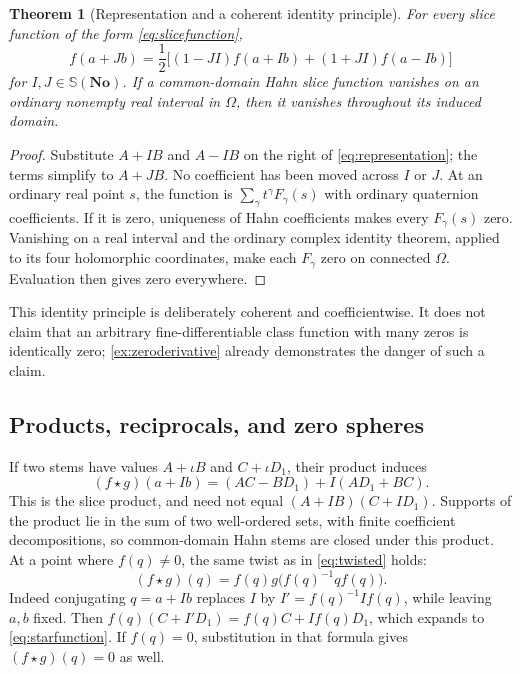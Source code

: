 \documentclass[11pt,letterpaper]{article}
\numberwithin{equation}{section}
\newtheorem{theorem}{Theorem}[section]
\theoremstyle{definition}
\theoremstyle{remark}
\newcommand{\No}{\mathbf{No}}
\begin{document}
\begin{theorem}[Representation and a coherent identity principle]\label{thm:representation}
For every slice function of the form \eqref{eq:slicefunction},
\begin{equation}\label{eq:representation}
 f(a+Jb)=\frac12\bigl[(1-JI)f(a+Ib)+(1+JI)f(a-Ib)\bigr]
\end{equation}
for $I,J\in\mathbb S(\No)$. If a common-domain Hahn slice function vanishes on an ordinary
nonempty real interval in $\Omega$, then it vanishes throughout its induced domain.
\end{theorem}
\begin{proof}
Substitute $A+IB$ and $A-IB$ on the right of \eqref{eq:representation}; the terms simplify
to $A+JB$. No coefficient has been moved across $I$ or $J$.
At an ordinary real point $s$, the function is
$\sum_\gamma t^\gamma F_\gamma(s)$ with ordinary quaternion coefficients. If it is zero,
uniqueness of Hahn coefficients makes every $F_\gamma(s)$ zero. Vanishing on a real interval
and the ordinary complex identity theorem, applied to its four holomorphic coordinates,
make each $F_\gamma$ zero on connected $\Omega$. Evaluation then gives zero everywhere.
\end{proof}

This identity principle is deliberately coherent and coefficientwise. It does not claim that
an arbitrary fine-differentiable class function with many zeros is identically zero;
\cref{ex:zeroderivative} already demonstrates the danger of such a claim.

\subsection{Products, reciprocals, and zero spheres}
If two stems have values $A+\iota B$ and $C+\iota D_1$, their product induces
\begin{equation}\label{eq:starfunction}
 (f\star g)(a+Ib)=(AC-BD_1)+I(AD_1+BC).
\end{equation}
This is the slice product, and need not equal $(A+IB)(C+ID_1)$. Supports of the product
lie in the sum of two well-ordered sets, with finite coefficient decompositions, so common-domain
Hahn stems are closed under this product.
At a point where $f(q)\ne0$, the same twist as in \eqref{eq:twisted} holds:
\begin{equation}\label{eq:twistedfunction}
 (f\star g)(q)=f(q)g\bigl(f(q)^{-1}qf(q)\bigr).
\end{equation}
Indeed conjugating $q=a+Ib$ replaces $I$ by $I'=f(q)^{-1}If(q)$, while leaving $a,b$ fixed.
Then $f(q)(C+I'D_1)=f(q)C+If(q)D_1$, which expands to \eqref{eq:starfunction}.
If $f(q)=0$, substitution in that formula gives $(f\star g)(q)=0$ as well.
\end{document}
